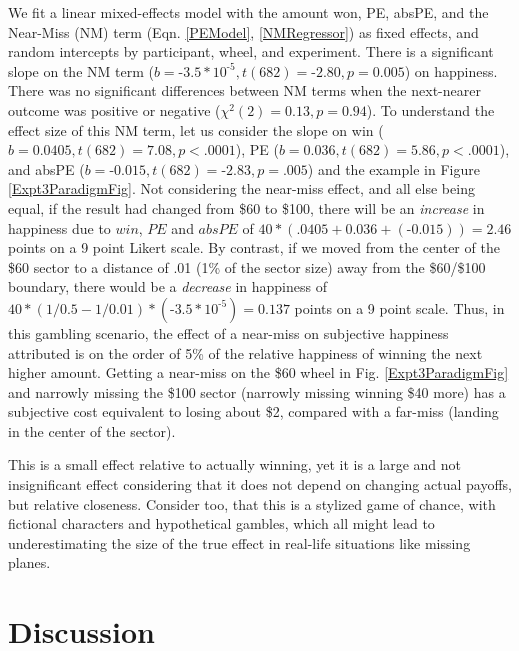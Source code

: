 \documentclass[10pt,letterpaper]{article}
\newcommand{\red}[1]{\textcolor{Red}{#1}}
\begin{document}
We fit a linear mixed-effects model with the amount won, PE, absPE, and the Near-Miss (NM) term (Eqn. \ref{PEModel}, \ref{NMRegressor}) as fixed effects, and random intercepts by participant, wheel, and experiment. There is a significant slope on the NM term ($b = \text{-}3.5 * 10^{\text{-}5}, t(682)=\text{-}2.80, p=0.005$) on happiness. There was no significant differences between NM terms when the next-nearer outcome was positive or negative ($\chi^2(2)=0.13, p=0.94$). To understand the effect size of this NM term, let us consider the slope on win ($b = 0.0405, t(682) = 7.08, p<.0001$), PE ($b=0.036, t(682)=5.86, p<.0001$), and absPE ($b=\text{-}0.015, t(682) = \text{-}2.83, p=.005$) and the example in Figure \ref{Expt3ParadigmFig}. Not considering the near-miss effect, and all else being equal, if the result had changed from \$60 to \$100, there will be an \textit{increase} in happiness due to $win$, $PE$ and $absPE$ of $40*(.0405+0.036+(\text{-}0.015)) = 2.46$ points on a 9 point Likert scale. By contrast, if we moved from the center of the \$60 sector to a distance of .01 (1\% of the sector size) away from the \$60/\$100 boundary, there would be a \textit{decrease} in happiness of $40*(1/0.5 - 1/0.01)*(\text{-}3.5 * 10^{\text{-}5}) = 0.137$ points on a 9 point scale. Thus, in this gambling scenario, the effect of a near-miss on subjective happiness attributed is on the order of 5\% of the relative happiness of winning the next higher amount. Getting a near-miss on the \$60 wheel in Fig. \ref{Expt3ParadigmFig} and narrowly missing the \$100 sector (narrowly missing winning \$40 more) has a subjective cost equivalent to losing about \$2, compared with a far-miss (landing in the center of the sector). 

This is a small effect relative to actually winning, yet it is a large and not insignificant effect considering that it does not depend on changing actual payoffs, but relative closeness. Consider too, that this is a stylized game of chance, with fictional characters and hypothetical gambles, which all might lead to underestimating the size of the true effect in real-life situations like missing planes.


\section{Discussion}
\end{document}

